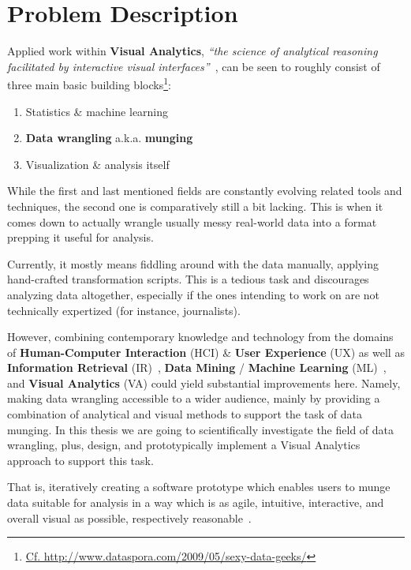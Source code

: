 \section{Problem Description}

Applied work within \textbf{Visual Analytics}, \textit{``the science of
analytical reasoning facilitated by interactive visual interfaces''}~\cite{Thomas2006}, can be seen to roughly consist of three main basic building blocks\footnote{\href{http://medriscoll.com/post/4740157098/the-three-sexy-skills-of-data-geeks}{Cf. http://www.dataspora.com/2009/05/sexy-data-geeks/}}:
\begin{enumerate}
  \item Statistics \& machine learning
  \item \textbf{Data wrangling} a.k.a. \textbf{munging}
  \item Visualization \& analysis itself
\end{enumerate}

While the first and last mentioned fields are constantly evolving related tools and techniques, the second one is comparatively still a bit lacking. This is when it comes down to actually wrangle usually messy real-world data into a format prepping it useful for analysis.

Currently, it mostly means fiddling around with the data manually, applying hand-crafted transformation scripts. This is a tedious task and discourages analyzing data altogether, especially if the ones intending to work on are not technically expertized (for instance, journalists).

However, combining contemporary knowledge and technology from the domains of \textbf{Human-Computer Interaction} (HCI) \& \textbf{User Experience} (UX) as well as \textbf{Information Retrieval} (IR)~\cite{Manning2008}, \textbf{Data Mining} / \textbf{Machine Learning} (ML)~\cite{Witten2011}, and \textbf{Visual Analytics} (VA) could yield substantial improvements here. Namely, making data wrangling accessible to a wider audience, mainly by providing a combination of analytical and visual methods to support the task of data munging. In this thesis we are going to scientifically investigate the field of data wrangling, plus, design, and prototypically implement a Visual Analytics approach to support this task.

That is, iteratively creating a software prototype which enables users to munge data suitable for analysis in a way which is as agile, intuitive, interactive, and overall visual as possible, respectively reasonable~\cite{Norman2002}.

